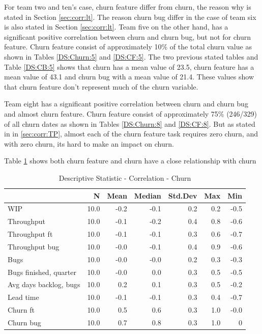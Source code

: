 \documentclass[UKenglish]{ifimaster}  %
\begin{document}
For team two and ten's case, churn feature differ from churn, the reason why is stated in Section \ref{sec:corr:lt}. The reason churn bug differ in the case of team six is also stated in Section \ref{sec:corr:lt}. Team five on the other hand,  has a significant positive correlation between churn and churn bug, but not for churn feature.  Churn feature consist of approximately 10\% of the total churn value as shown in Tables \ref{DS:Churn:5} and \ref{DS:CF:5}. The two previous stated tables and Table \ref{DS:CB:5} shows that churn has a mean value of 23.5, churn feature has a mean value of 43.1 and churn bug with a mean value of 21.4. These values show that churn feature don't represent much of the churn variable. 

Team eight has a significant positive correlation between churn and churn bug and almost churn feature. Churn feature consist of approximately 75\% (246/329) of all churn dates as shown in Tables \ref{DS:Churn:8} and \ref{DS:CF:8}. But as stated in in \ref{sec:corr:TP}, almost each of the churn feature task requires zero churn, and with zero churn, its hard to make an impact on churn. 

Table \ref{DS:corr:Churn} shows both churn feature and churn have a close relationship with churn
\begin{table}[!htbp]
 \centering
 \begin{tabular}{ | l | r | r | r | r | r | r | }
 \hline
& \bf{N} & \bf{Mean} & \bf{Median} & \bf{Std.Dev} & \bf{Max} & \bf{Min} \\ \hline
WIP  & 10.0 & -0.2 & -0.1 & 0.2 & 0.2 & -0.5\\ \hline
Throughput  & 10.0 & -0.1 & -0.2 & 0.4 & 0.8 & -0.6\\ \hline
Throughput ft  & 10.0 & -0.1 & -0.1 & 0.3 & 0.6 & -0.7\\ \hline
Throughput bug  & 10.0 & -0.0 & -0.1 & 0.4 & 0.9 & -0.6\\ \hline
Bugs  & 10.0 & -0.0 & -0.0 & 0.2 & 0.3 & -0.3\\ \hline
Bugs finished, quarter  & 10.0 & -0.0 & 0.0 & 0.3 & 0.5 & -0.5\\ \hline
Avg days backlog, bugs  & 10.0 & 0.2 & 0.1 & 0.3 & 0.5 & -0.2\\ \hline
Lead time  & 10.0 & -0.1 & -0.1 & 0.3 & 0.4 & -0.7\\ \hline
Churn ft  & 10.0 & 0.5 & 0.6 & 0.3 & 1.0 & -0.0\\ \hline
Churn bug  & 10.0 & 0.7 & 0.8 & 0.3 & 1.0 & 0\\ \hline
\end{tabular}
 \caption{Descriptive Statistic - Correlation - Churn}
 \label{DS:corr:Churn}
 \end{table}
 
\end{document}
